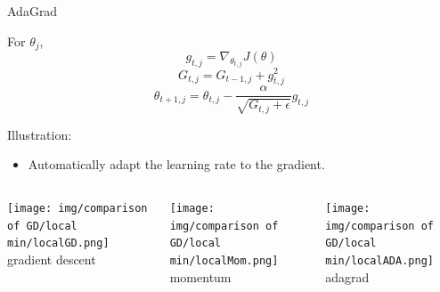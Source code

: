 \documentclass{beamer}
\begin{document}















\begin{frame}{AdaGrad}
\begin{theorem}
    For $\theta_j$,
    $$ g_{t,j} = \nabla_{\theta_{t,j}}J(\theta) $$
    $$ G_{t,j} = G_{t-1,j} + g_{t,j}^2  $$
    $$\theta_{t+1,j} = \theta_{t,j} - \frac{\alpha}{\sqrt{G_{t,j} + \epsilon}} g_{t,j}$$
    
\end{theorem}
Illustration:
\begin{itemize}
    \item Automatically adapt the learning rate to the gradient.
\end{itemize}

\begin{columns}[T,onlytextwidth]

	\centering 
	\texttt{[image: img/comparison of GD/local min/localGD.png]}
    gradient descent
    
	\centering 
	\texttt{[image: img/comparison of GD/local min/localMom.png]}
	momentum
	
	\centering 
	\texttt{[image: img/comparison of GD/local min/localADA.png]}
	adagrad

\end{columns}







\end{frame}
\end{document}

